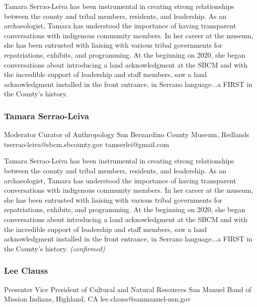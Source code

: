 \documentclass{report}
\begin{document}
              Tamara Serrao-Leiva has been instrumental in creating strong relationships between the county and tribal members, residents, and leadership. As an archaeologist, Tamara has understood the importance of having transparent conversations with indigenous community members. In her career at the museum, she has been entrusted with liaising with various tribal governments for repatriations, exhibits, and programming. At the beginning on 2020, she began conversations about introducing a land acknowledgment at the SBCM and with the incredible support of leadership and staff members, saw a land acknowledgment installed in the front entrance, in Serrano language...a FIRST in the County’s history.\newline


              
                \subsubsection*{ Tamara Serrao-Leiva }
                Moderator\newline
                Curator of Anthropology\newline
                San Bernardino County Museum, Redlands
                \newline
                tserrao-leiva@sbcm.sbcounty.gov\newline
                tamserlei@gmail.com\newline

                Tamara Serrao-Leiva has been instrumental in creating strong relationships between the county and tribal members, residents, and leadership. As an archaeologist, Tamara has understood the importance of having transparent conversations with indigenous community members. In her career at the museum, she has been entrusted with liaising with various tribal governments for repatriations, exhibits, and programming. At the beginning on 2020, she began conversations about introducing a land acknowledgment at the SBCM and with the incredible support of leadership and staff members, saw a land acknowledgment installed in the front entrance, in Serrano language...a FIRST in the County’s history.\newline
                \emph{ (confirmed) }
              

              
                \subsubsection*{ Lee Clauss }
                Presenter\newline
                Vice President of Cultural and Natural Resources\newline
                San Manuel Band of Mission Indians, Highland, CA
                \newline
                lee.clauss@sanmanuel-nsn.gov\newline
                
\end{document}
